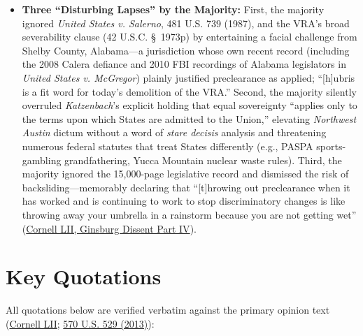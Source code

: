 \documentclass[12pt]{article}
\begin{document}
\begin{itemize}
    \item \textbf{Three ``Disturbing Lapses'' by the Majority:} First, the majority ignored \emph{United States v. Salerno}, 481 U.S. 739 (1987), and the VRA's broad severability clause (42 U.S.C. \S~1973p) by entertaining a facial challenge from Shelby County, Alabama---a jurisdiction whose own recent record (including the 2008 Calera defiance and 2010 FBI recordings of Alabama legislators in \emph{United States v. McGregor}) plainly justified preclearance as applied; ``[h]ubris is a fit word for today's demolition of the VRA.'' Second, the majority silently overruled \emph{Katzenbach}'s explicit holding that equal sovereignty ``applies only to the terms upon which States are admitted to the Union,'' elevating \emph{Northwest Austin} dictum without a word of \emph{stare decisis} analysis and threatening numerous federal statutes that treat States differently (e.g., PASPA sports-gambling grandfathering, Yucca Mountain nuclear waste rules). Third, the majority ignored the 15,000-page legislative record and dismissed the risk of backsliding---memorably declaring that ``[t]hrowing out preclearance when it has worked and is continuing to work to stop discriminatory changes is like throwing away your umbrella in a rainstorm because you are not getting wet'' (\href{https://www.law.cornell.edu/supremecourt/text/12-96}{Cornell LII, Ginsburg Dissent Part IV}).
\end{itemize}

\section{Key Quotations}

All quotations below are verified verbatim against the primary opinion text (\href{https://www.law.cornell.edu/supremecourt/text/12-96}{Cornell LII}; \href{https://tile.loc.gov/storage-services/service/ll/usrep/usrep570/usrep570529/usrep570529.pdf}{570 U.S. 529 (2013)}):
\end{document}
